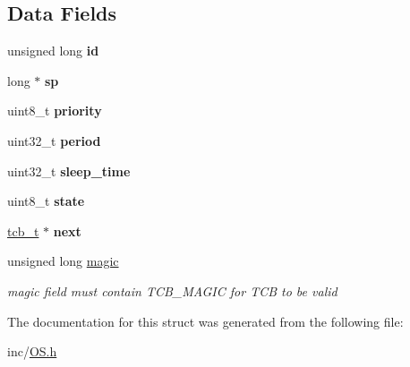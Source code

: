 \subsection*{Data Fields}
\begin{DoxyCompactItemize}
\item 
unsigned long {\bfseries id}\hypertarget{structtcb__t_a118c7b75aa386baeaf6d7545a2354534}{}\label{structtcb__t_a118c7b75aa386baeaf6d7545a2354534}

\item 
long $\ast$ {\bfseries sp}\hypertarget{structtcb__t_a4a742fdda936ae051559b1f02c586db2}{}\label{structtcb__t_a4a742fdda936ae051559b1f02c586db2}

\item 
uint8\+\_\+t {\bfseries priority}\hypertarget{structtcb__t_a09ae1a47b57752388c96da17a595f7c1}{}\label{structtcb__t_a09ae1a47b57752388c96da17a595f7c1}

\item 
uint32\+\_\+t {\bfseries period}\hypertarget{structtcb__t_a390df6b2cd7e63a413364d58fc9cc6cf}{}\label{structtcb__t_a390df6b2cd7e63a413364d58fc9cc6cf}

\item 
uint32\+\_\+t {\bfseries sleep\+\_\+time}\hypertarget{structtcb__t_ad1d5898599bf355e958f52e78c329e4b}{}\label{structtcb__t_ad1d5898599bf355e958f52e78c329e4b}

\item 
uint8\+\_\+t {\bfseries state}\hypertarget{structtcb__t_a617ae770c778e65d933f47bf66be58a3}{}\label{structtcb__t_a617ae770c778e65d933f47bf66be58a3}

\item 
\hyperlink{structtcb__t}{tcb\+\_\+t} $\ast$ {\bfseries next}\hypertarget{structtcb__t_a11338e02677bd2b389227a91d7d35580}{}\label{structtcb__t_a11338e02677bd2b389227a91d7d35580}

\item 
unsigned long \hyperlink{structtcb__t_a5e4def3213def13d35e636f46d07fb7b}{magic}\hypertarget{structtcb__t_a5e4def3213def13d35e636f46d07fb7b}{}\label{structtcb__t_a5e4def3213def13d35e636f46d07fb7b}

\begin{DoxyCompactList}\small\item\em magic field must contain T\+C\+B\+\_\+\+M\+A\+G\+IC for T\+CB to be valid \end{DoxyCompactList}\end{DoxyCompactItemize}


The documentation for this struct was generated from the following file\+:\begin{DoxyCompactItemize}
\item 
inc/\hyperlink{OS_8h}{O\+S.\+h}\end{DoxyCompactItemize}
